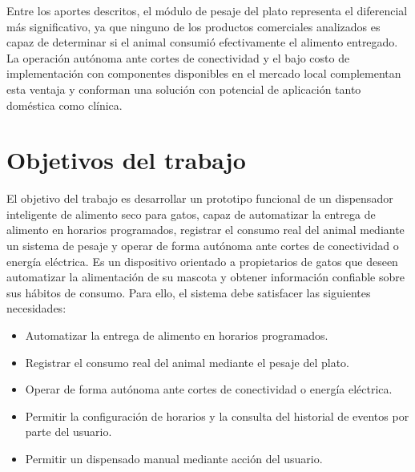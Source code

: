 Entre los aportes descritos, el módulo de pesaje del plato representa el diferencial más significativo, ya que ninguno de los productos comerciales analizados es capaz de determinar si el animal consumió efectivamente el alimento entregado. La operación autónoma ante cortes de conectividad y el bajo costo de implementación con componentes disponibles en el mercado local complementan esta ventaja y conforman una solución con potencial de aplicación tanto doméstica como clínica.


\section{Objetivos del trabajo}

El objetivo del trabajo es desarrollar un prototipo funcional de un dispensador inteligente de alimento seco para gatos, capaz de automatizar la entrega de alimento en horarios programados, registrar el consumo real del animal mediante un sistema de pesaje y operar de forma autónoma ante cortes de conectividad o energía eléctrica. Es un dispositivo orientado a propietarios de gatos que deseen automatizar la alimentación de su mascota y obtener información confiable sobre sus hábitos de consumo. Para ello, el sistema debe satisfacer las siguientes necesidades:

\begin{itemize}
    \item Automatizar la entrega de alimento en horarios programados.
    \item Registrar el consumo real del animal mediante el pesaje del plato.
    \item Operar de forma autónoma ante cortes de conectividad o energía eléctrica.
    \item Permitir la configuración de horarios y la consulta del historial de eventos por parte del usuario.
    \item Permitir un dispensado manual mediante acción del usuario.
\end{itemize}